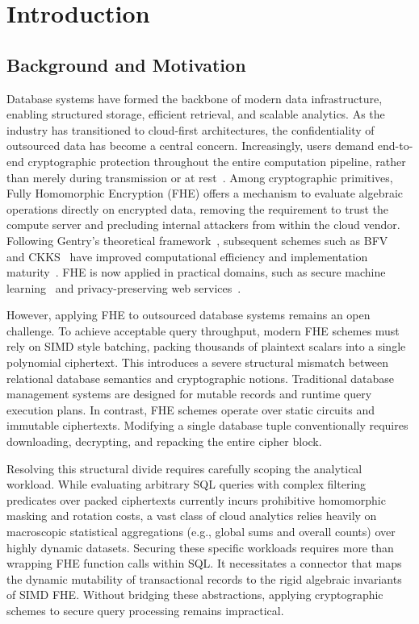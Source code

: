 \documentclass[sigconf,nonacm]{acmart}
\begin{document}
\maketitle

\section{Introduction}

\subsection{Background and Motivation}

Database systems have formed the backbone of modern data infrastructure, enabling structured storage, efficient retrieval, and scalable analytics. As the industry has transitioned to cloud-first architectures, the confidentiality of outsourced data has become a central concern. Increasingly, users demand end-to-end cryptographic protection throughout the entire computation pipeline, rather than merely during transmission or at rest~\cite{rag_sigmod04}. Among cryptographic primitives, Fully Homomorphic Encryption (FHE) offers a mechanism to evaluate algebraic operations directly on encrypted data, removing the requirement to trust the compute server and precluding internal attackers from within the cloud vendor. Following Gentry's theoretical framework~\cite{gentry2009}, subsequent schemes such as BFV~\cite{FV2012} and CKKS~\cite{ckks2016} have improved computational efficiency and implementation maturity~\cite{openfhe}. FHE is now applied in practical domains, such as secure machine learning~\cite{boemer2020mp2ml,han2023} and privacy-preserving web services~\cite{bchen_www26,mkhan_icws24}.

However, applying FHE to outsourced database systems remains an open challenge. To achieve acceptable query throughput, modern FHE schemes must rely on SIMD style batching, packing thousands of plaintext scalars into a single polynomial ciphertext. This introduces a severe structural mismatch between relational database semantics and cryptographic notions. Traditional database management systems are designed for mutable records and runtime query execution plans. In contrast, FHE schemes operate over static circuits and immutable ciphertexts. Modifying a single database tuple conventionally requires downloading, decrypting, and repacking the entire cipher block.

Resolving this structural divide requires carefully scoping the analytical workload. While evaluating arbitrary SQL queries with complex filtering predicates over packed ciphertexts currently incurs prohibitive homomorphic masking and rotation costs, a vast class of cloud analytics relies heavily on macroscopic statistical aggregations (e.g., global sums and overall counts) over highly dynamic datasets. Securing these specific workloads requires more than wrapping FHE function calls within SQL. It necessitates a connector that maps the dynamic mutability of transactional records to the rigid algebraic invariants of SIMD FHE. Without bridging these abstractions, applying cryptographic schemes to secure query processing remains impractical. 
\end{document}

